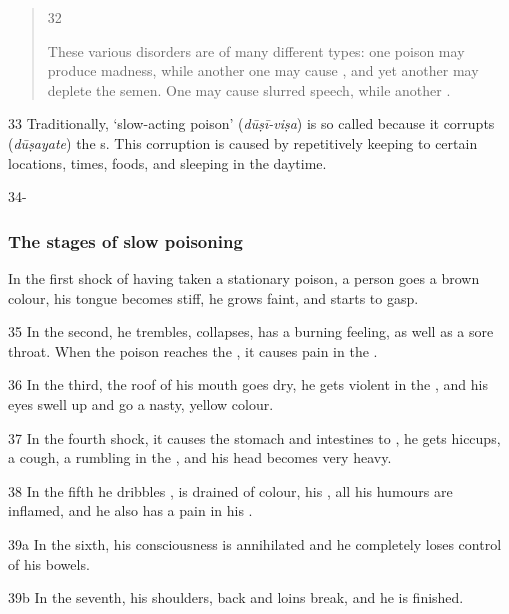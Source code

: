 \begin{translation}
\begin{verse}
        \item[32]
        \begin{sloppypar}
            These various disorders are of many different types: one poison may 
            produce
            madness, while another one may cause , and 
            yet
            another may deplete the semen. One may cause slurred speech, while 
            another
            .
        \end{sloppypar}
    \end{verse}

    
    \item[33]
    Traditionally, `slow-acting poison' (\emph{dūṣī-viṣa}) is so called because
    it corrupts (\emph{dūṣayate}) the s.  This
    corruption is caused by repetitively keeping to certain locations, times,
    foods, and sleeping in the daytime.
    
    \item[34-]
    \subsubsection{The stages of slow poisoning}
    In the first shock of having taken a stationary poison, a person goes a
    brown colour, his tongue becomes stiff, he grows faint, and starts to gasp.
    \item[35]
    In the second, he trembles, collapses, has a burning feeling, as well as a
    sore throat.  When the poison reaches the , it causes
    pain in the .
    \item[36]
    In the third, the roof of his mouth goes dry, he gets violent  in the , and his eyes swell up and go 
        a
    nasty, yellow colour.
    \item[37]
    In the fourth shock, it causes the stomach and intestines to
    , he gets hiccups, a cough,  a rumbling in the
    , and his head becomes very heavy.
    \item[38]
    In the fifth he dribbles , is drained of colour,
    his ,  all his humours are inflamed, and he
    also has a pain in his .
    \item[39a]
    In the sixth, his consciousness is annihilated and he completely loses
    control of his bowels.
    \item[39b]
    In the seventh, his shoulders, back and loins break, and he is finished.
    

\end{translation}
